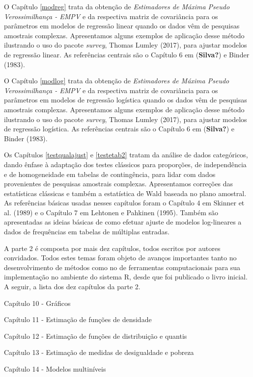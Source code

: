 \documentclass[
  12pt,
  brazilian,
]{book}
\theoremstyle{definition}
\theoremstyle{definition}
\theoremstyle{definition}
\theoremstyle{definition}
\theoremstyle{remark}
\begin{document}
O Capítulo \ref{modreg} trata da obtenção de \emph{Estimadores de Máxima Pseudo Verossimilhança - EMPV} e da respectiva matriz de covariância para os parâmetros em modelos de regressão linear quando os dados vêm de pesquisas amostrais complexas. Apresentamos alguns exemplos de aplicação desse método ilustrando o uso do pacote \emph{survey}, Thomas Lumley (2017), para ajustar modelos de regressão linear. As referências centrais são o Capítulo 6 em (\textbf{Silva?}) e Binder (1983).

O Capítulo \ref{modlog} trata da obtenção de \emph{Estimadores de Máxima Pseudo Verossimilhança - EMPV} e da respectiva matriz de covariância para os parâmetros em modelos de regressão logística quando os dados vêm de pesquisas amostrais complexas. Apresentamos alguns exemplos de aplicação desse método ilustrando o uso do pacote \emph{survey}, Thomas Lumley (2017), para ajustar modelos de regressão logística. As referências centrais são o Capítulo 6 em (\textbf{Silva?}) e Binder (1983).

Os Capítulos \ref{testqualajust} e \ref{testetab2} tratam da análise de dados
categóricos, dando ênfase à adaptação dos testes clássicos para proporções, de independência e de homogeneidade em tabelas de contingência, para lidar com dados provenientes de pesquisas amostrais complexas. Apresentamos correções das estatísticas clássicas e também a estatística de Wald baseada no plano amostral. As referências básicas usadas nesses capítulos foram o Capítulo 4 em Skinner et al. (1989) e o Capítulo 7 em Lehtonen e Pahkinen (1995). Também são apresentadas as ideias básicas de como efetuar ajuste de modelos log-lineares a dados de frequências em tabelas de múltiplas entradas.

A parte 2 é composta por mais dez capítulos, todos escritos por autores convidados. Todos estes temas foram objeto de avanços importantes tanto no desenvolvimento de métodos como no de ferramentas computacionais para sua implementação no ambiente do sistema R, desde que foi publicado o livro inicial. A seguir, a lista dos dez capítulos da parte 2.

Capítulo 10 - Gráficos

Capítulo 11 - Estimação de funções de densidade

Capítulo 12 - Estimação de funções de distribuição e quantis

Capítulo 13 - Estimação de medidas de desigualdade e pobreza

Capítulo 14 - Modelos multiníveis
\end{document}
